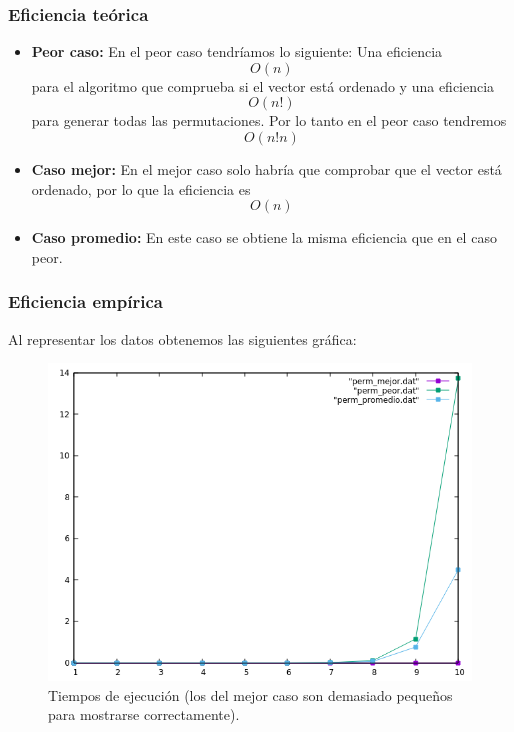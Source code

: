 \subsubsection{Eficiencia teórica}

\begin{itemize}
  \item \textbf{Peor caso:} En el peor caso tendríamos lo siguiente:
  Una eficiencia \begin{equation} O(n) \end{equation} para el algoritmo que comprueba si el vector está ordenado y una eficiencia \begin{equation} O(n!) \end{equation} para generar todas las permutaciones.
  Por lo tanto en el peor caso tendremos \begin{equation} O(n! n) \end{equation}
  
  \item \textbf{Caso mejor:} En el mejor caso solo habría que comprobar que el vector está ordenado, por lo que la eficiencia es \begin{equation} O(n) \end{equation} 
  \item \textbf{Caso promedio:} En este caso se obtiene la misma eficiencia que en el caso peor.
\end{itemize}

\subsubsection{Eficiencia empírica}

Al representar los datos obtenemos las siguientes gráfica:

\begin{figure}[H]
    \begin{center}
        \includegraphics[scale=0.7]{imagenes/g_p.png}
        \caption{Tiempos de ejecución (los del mejor caso son demasiado pequeños para mostrarse correctamente).}
        \label{fig15}
    \end{center}
\end{figure}

